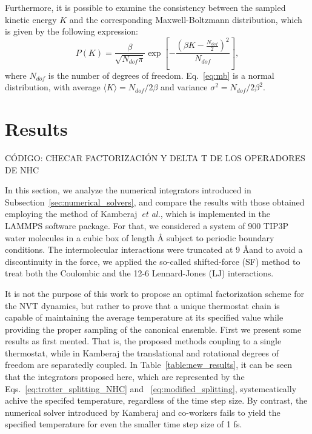 \documentclass[aip,jcp,reprint,amsmath,amssymb]{revtex4-1}
\begin{document}
Furthermore,  it is possible to examine the consistency between the sampled kinetic energy $K$ and the corresponding Maxwell-Boltzmann distribution, which is given by the following expression:
\begin{equation}
\label{eq:mb}
P(K) = \frac{\beta}{\sqrt{N_{dof}\pi}} \exp\left[-\frac{\left(\beta K - \frac{N_{dof}}{2}\right)^2}{N_{dof}} \right],
\end{equation}
where $N_{dof}$ is the number of degrees of freedom. Eq.~\eqref{eq:mb} is a normal distribution, with average  $ \langle K \rangle = N_{dof}/2\beta $ and variance $\sigma^2 = N_{dof}/2\beta^2$.

\section{Results}
\label{sec:numerical_results}

CÓDIGO: CHECAR FACTORIZACIÓN Y DELTA T DE LOS OPERADORES DE NHC

In this section, we analyze the numerical integrators introduced in Subsection~\ref{sec:numerical_solvers}, and compare the results with those obtained employing the method of Kamberaj~\textit{et al.}\cite{Kamberaj2005}, which is implemented in the LAMMPS\cite{Plimpton1995} software package. For that, we considered a system of 900 TIP3P\cite{Jorgensen_1983} water molecules in a cubic box of length {\AA} subject to periodic boundary conditions. The intermolecular interactions were truncated at 9 \AA and to avoid a discontinuity in the force, we applied the so-called shifted-force (SF) method\cite{Allen1989, Fennell2006, Toxvaerd_2011} to treat both the Coulombic and the 12-6 Lennard-Jones (LJ) interactions.

It is not the purpose of this work to propose an optimal factorization scheme for the NVT dynamics, but rather to prove that a unique thermostat chain is capable of maintaining the average temperature at its specified value while providing the proper sampling of the canonical ensemble. First we present some results as first mented. That is, the proposed methods coupling to a single thermostat, while in Kamberaj the translational and rotational degrees of freedom are separatedly coupled. In Table~\ref{table:new_results}, it can be seen that the integrators proposed here, which are represented by the Eqs.~\eqref{eq:trotter_splitting_NHC} and ~\eqref{eq:modified_splitting}, systemcatically achive the specifed temperature, regardless of the time step size. By contrast, the numerical solver introduced by Kamberaj and co-workers\cite{Kamberaj2005} fails to yield the specified temperature for even the smaller time step size of 1 fs.
 
\end{document}
